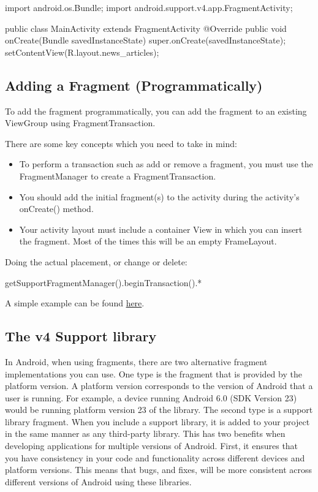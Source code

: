 \begin{android}
	import android.os.Bundle;
	import android.support.v4.app.FragmentActivity;
	
	public class MainActivity extends FragmentActivity {
		@Override
		public void onCreate(Bundle savedInstanceState) {
			super.onCreate(savedInstanceState);
			setContentView(R.layout.news_articles);
		}
	}
\end{android}

\subsection{Adding a Fragment (Programmatically)}
To add the fragment programmatically, you can add the fragment to an existing ViewGroup using FragmentTransaction. 

There are some key concepts which you need to take in mind:
\begin{itemize}
	\item To perform a transaction such as add or remove a fragment, you must use the FragmentManager to create a FragmentTransaction.
	\item You should add the initial fragment(s) to the activity during the activity's onCreate() method.
	\item  Your activity layout must include a container View in which you can insert the fragment. Most of the times this will be an empty FrameLayout.
\end{itemize}

Doing the actual placement, or change or delete:

\begin{android}
	 getSupportFragmentManager().beginTransaction().*
\end{android}

 A simple example can be found \href{https://github.com/commonsguy/cw-omnibus/tree/master/Fragments/Dynamic}{here}.



\subsection{The v4 Support library}
In Android, when using fragments, there are two alternative fragment implementations you can use. One type is the fragment that is provided by the platform version. A platform version corresponds to the version of Android that a user is running. For example, a device running Android 6.0 (SDK Version 23) would be running platform version 23 of the library.
The second type is a support library fragment. When you include a support library, it is added to your project in the same manner as any third-party library. This has two benefits when developing applications for multiple versions of Android.
First, it ensures that you have consistency in your code and functionality across different devices and platform versions. This means that bugs, and fixes, will be more consistent across different versions of Android using these libraries.


